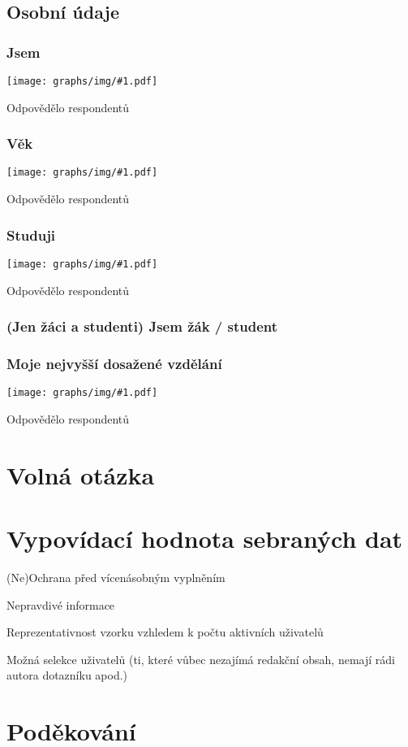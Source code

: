 \documentclass[12pt, a4paper, twoside]{article}
\newcommand{\answercount}[1]{Odpovědělo  respondentů}
\newcommand{\includegraph}[1]{
  \texttt{[image: graphs/img/\#1.pdf]}

  \answercount{#1}
}
\begin{document}
\subsection{Osobní údaje}\label{sec:osobni}

\subsubsection{Jsem}

\includegraph{jsem}

\subsubsection{Věk}

\includegraph{vek}

\subsubsection{Studuji}

\includegraph{studuji}

\subsubsection{(Jen žáci a studenti) Jsem žák / student}

\subsubsection{Moje nejvyšší dosažené vzdělání}

\includegraph{moje_nejvyssi_dosazene_vzdelani}

\section{Volná otázka }

\section{Vypovídací hodnota sebraných dat}

(Ne)Ochrana před vícenásobným vyplněním

Nepravdivé informace

Reprezentativnost vzorku vzhledem k počtu aktivních uživatelů

Možná selekce uživatelů (ti, které vůbec nezajímá redakční obsah,
nemají rádi autora dotazníku apod.)

\section*{Poděkování}
\end{document}
